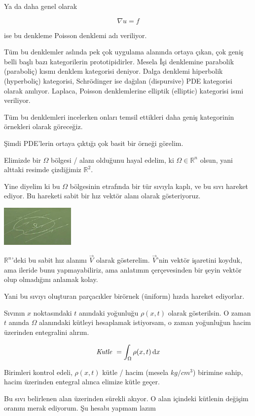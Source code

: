 \documentclass[12pt,fleqn]{article}\usepackage{../../common}
\begin{document}
Ya da daha genel olarak 

$$ \nabla u = f $$

ise bu denkleme Poisson denklemi adı veriliyor. 

Tüm bu denklemler aslında pek çok uygulama alanında ortaya çıkan, çok geniş
belli başlı bazı kategorilerin prototipidirler. Mesela İşi denklemine
parabolik (paraboliç) kısmı denklem kategorisi deniyor. Dalga denklemi
hiperbolik (hyperboliç) kategorisi, Schrödinger ise dağılan (dispursive)
PDE kategorisi olarak anılıyor. Laplaca, Poisson denklemlerine elliptik
(elliptic) kategorisi ismi veriliyor. 

Tüm bu denklemleri incelerken onları temsil ettikleri daha geniş
kategorinin örnekleri olarak göreceğiz. 

Şimdi PDE'lerin ortaya çıktığı çok basit bir örneği görelim. 

Elimizde bir $\Omega$ bölgesi / alanı olduğunu hayal edelim, ki $\Omega \in
\mathbb{R}^n$ olsun, yani alttaki resimde çizdiğimiz $\mathbb{R}^2$.

Yine diyelim ki bu $\Omega$ bölgesinin etrafında bir tür sıvıyla kaplı, ve
bu sıvı hareket ediyor. Bu hareketi sabit bir hız vektör alanı olarak
gösteriyoruz. 

\includegraphics[height=2cm]{4_1.png}

$\mathbb{R}^n$'deki bu sabit hız alanını $\vec{V}$ olarak gösterelim. $\vec{V}$'nin vektör işaretini 
koyduk, ama ileride bunu yapmayabiliriz, ama anlatımın çerçevesinden bir
şeyin  vektör olup olmadığını anlamak kolay. 

Yani bu sıvıyı oluşturan parçacıkler birörnek (üniform) hızda hareket
ediyorlar. 

Sıvının $x$ noktasındaki $t$ anındaki yoğunluğu $\rho(x,t)$ olarak
gösterilsin. O zaman $t$ anında $\Omega$ alanındaki kütleyi hesaplamak
istiyorsam, o zaman yoğunluğun hacim üzerinden entegralini alırım. 

$$ \textit{Kutle } = \int_\Omega \rho(x,t) \,\mathrm{d} x $$

Birimleri kontrol edeli, $\rho(x,t)$ kütle / hacim (mesela $kg / cm^3$)
birimine sahip, hacim üzerinden entegral alınca elimize kütle geçer. 

Bu sıvı belirlenen alan üzerinden sürekli akıyor. O alan içindeki kütlenin
değişim oranını merak ediyorum. Şu hesabı yapmam lazım
\end{document}
